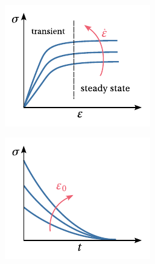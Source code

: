 \begin{figure}
\centering
\begin{subfigure}[b]{0.30\textwidth}
            \centering
            \includegraphics[width=\textwidth]{figures/burgers_cnst_strain_rate}
            \caption{}
            \label{subfig:burgers_cnst_strain_rate}
    \end{subfigure} \hfill
    \begin{subfigure}[b]{0.30\textwidth}
            \centering
            \includegraphics[width=\textwidth]{figures/burgers_stress_relax}

\end{subfigure}
\end{figure}
